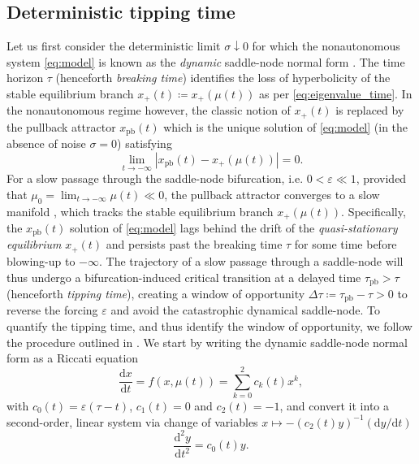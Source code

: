 \documentclass[11pt,a4paper]{article}
\theoremstyle{plain}
\theoremstyle{definition}
\theoremstyle{remark}
\newcommand{\dd}{\mathrm{d}}
\newcommand{\xpb}{x_{\mathrm{pb}}}
\newcommand{\taupb}{\tau_{\mathrm{pb}}}
\begin{document}
\subsection{Deterministic tipping time}\label{subsec:delay}
Let us first consider the deterministic limit $\sigma\downarrow0$ for which the nonautonomous system \eqref{eq:model} is known as the \emph{dynamic} saddle-node normal form \cite{Berglund2006}.
The time horizon $\tau$ (henceforth \emph{breaking time}) identifies the loss of hyperbolicity of the stable equilibrium branch $x_+(t)\coloneqq x_+(\mu(t))$ as per \eqref{eq:eigenvalue_time}.
In the nonautonomous regime however, the classic notion of $x_+(t)$ is replaced by the pullback attractor $\xpb(t)$ which is the unique solution of \eqref{eq:model} (in the absence of noise $\sigma=0$) satisfying 
%
\begin{equation}\label{eq:pb_attractor}
        \lim_{t\to-\infty}|\xpb(t)-x_+(\mu(t))|=0 .
\end{equation}
%
For a slow passage through the saddle-node bifurcation, i.e. $0<\varepsilon\ll1$, provided that $\mu_0=\lim_{t\to-\infty}\mu(t)\ll0$, the pullback attractor converges to a slow manifold \cite[Thm.~$2.1.7$]{Berglund2006}, which tracks the stable equilibrium branch $x_+(\mu(t))$.
Specifically, the $\xpb(t)$ solution of \eqref{eq:model} lags behind the drift of the \emph{quasi-stationary equilibrium} $x_+(t)$ and persists past the breaking time $\tau$ for some time before blowing-up to $-\infty$.
The trajectory of a slow passage through a saddle-node will thus undergo a bifurcation-induced critical transition at a delayed time $\taupb>\tau$ (henceforth \emph{tipping time}), creating a window of opportunity $\Delta\tau\coloneqq\tau_{\mathrm{pb}}-\tau>0$ to reverse the forcing $\varepsilon$ and avoid the catastrophic dynamical saddle-node.
To quantify the tipping time, and thus identify the window of opportunity, we follow the procedure outlined in \cite{Li2019}.
We start by writing the dynamic saddle-node normal form as a Riccati equation
%
\begin{equation}\label{eq:riccati}
        \frac{\dd x}{\dd t} = f(x,\mu(t)) = \sum_{k=0}^{2}c_k(t)x^k,
\end{equation}
%
with $c_0(t)=\varepsilon(\tau - t)$, $c_1(t)=0$ and $c_2(t)=-1$, and convert it into a second-order, linear system via change of variables $x\mapsto -(c_2(t)y)^{-1}(\dd y/\dd t)$
%
\begin{equation}\label{eq:converted}
        \frac{\dd^2y}{\dd t^2} = c_0(t)y.
\end{equation}
\end{document}
